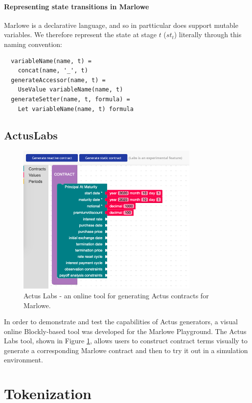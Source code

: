 \documentclass[runningheads]{llncs}
\begin{document}
\paragraph{Representing state transitions in Marlowe}

Marlowe is a declarative language, and so in partticular does support mutable variables. We therefore represent the state at stage $t$ ($st_{t}$) literally through this naming convention:

\begin{verbatim}
  variableName(name, t) = 
    concat(name, '_', t) 
  generateAccessor(name, t) = 
    UseValue variableName(name, t) 
  generateSetter(name, t, formula) = 
    Let variableName(name, t) formula 
\end{verbatim}


\subsection{ActusLabs}

\begin{figure}[t]
\includegraphics[width=0.8\textwidth]{images/labs.png}
\caption{Actus Labs - an online tool for generating Actus contracts for Marlowe.} 
\label{fig3} 
\end{figure} 

In order to demonstrate and test the capabilities of Actus generators,
a visual online Blockly-based tool was developed for the Marlowe Playground.
The Actus Labs tool, shown in Figure \ref{fig3}, allows users to construct contract terms visually
to generate a corresponding Marlowe contract and then to try it out in a simulation 
environment.

\section{Tokenization}
\label{tokenization}
\end{document}
